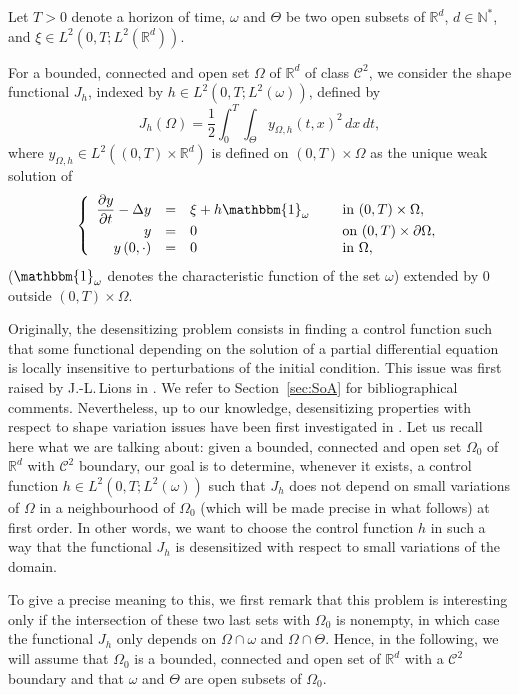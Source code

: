 \documentclass[JEP,XML,SOM,Unicode,NoFloatCountersInSection]{cedram}
\newcommand\R{{\mathbb R}}
\theoremstyle{definition}
\begin{document}
Let $T>0$ denote a horizon of time, $\omega$ and $\Theta$ be two open subsets of $\R^d$, $d\in\mathbb N^*$, and $\xi \in L^2(0,T; L^2(\R^d))$.

For a bounded, connected and open set $\Omega$ of $\mathbb{R}^d$ of class $\mathscr{C}^2$, we consider the shape functional $J_h$, indexed by $h \in L^2(0,T; L^2(\omega))$, defined by
\begin{equation}
\label{def-J}
J_h(\Omega) = \dfrac{1}{2}\int_{0}^{T} \int_{\Theta}y_{\Omega,h}(t,x)^{2}\, dx\,dt,
\end{equation}
where $y_{\Omega,h}\in L^2((0,T)\times \mathbb R^d)$ is defined on $(0,T)\times\Omega$ as the unique weak solution of
\begin{equation}
\label{y-Omega-h}
\left\{
\begin{array}{rcll}
\dfrac{\partial y}{\partial t}-\Delta y &=&\xi +h\mathbbm{1}_{\omega}\quad&\text{ in }(0,T) \times \Omega,
\\
y&=& 0 &\text{ on }(0,T) \times \partial \Omega,
\\
y\left(0,\cdot\right) &=& 0 &\text{ in }\Omega,
\end{array}
\right.
\end{equation}
($\mathbbm{1}_\omega$ denotes the characteristic function of the set $\omega$) extended by $0$ outside $(0,T) \times \Omega$.

Originally, the desensitizing problem consists in finding a control function such that some functional depending on the solution of a partial differential equation is locally {insensitive} to perturbations of the initial condition. This issue was first raised by J.\nobreakdash-L.\,Lions in \cite{Lions-1990}. We refer to Section~\ref{sec:SoA} for bibliographical comments. Nevertheless, up to our knowledge, desensitizing properties with respect to shape variation issues have been first investigated in \cite{Lissy-Privat-Simpore}. Let us recall here what we are talking about: given a bounded, connected and open set $\Omega_0$ of $\R^d$ with $\mathscr{C}^2$ boundary, our goal is to determine, whenever it exists, a control function $h \in L^2(0,T;L^2(\omega))$ such that $J_h$ does not depend on small variations of $\Omega$ in a neighbourhood of $\Omega_0$ (which will be made precise in what follows) at first order. In other words, we want to choose the control function $h$ in such a way that the functional $J_h$ is desensitized with respect to small variations of the domain.

To give a precise meaning to this, we first remark that this problem is interesting only if the intersection of these two last sets with $\Omega_0$ is nonempty, in which case the functional $J_h$ only depends on $\Omega\cap\omega$ and $\Omega\cap\Theta$. Hence, in the following, we will assume that $\Omega_0$ is a bounded, connected and open set of $\R^d$ with a $\mathscr{C}^2$ boundary and that $\omega$ and $\Theta$ are open subsets of $\Omega_{0}$.
\end{document}
